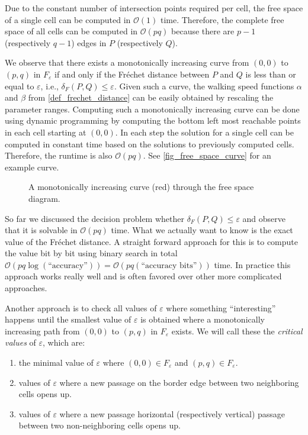 \documentclass[
oneside,
fontsize=11pt
]{scrartcl}
\begin{document}
Due to the constant number of intersection points required per cell, 
the free space of a single cell can be computed in $\mathcal{O}(1)$ time.
Therefore, the complete free space of all cells can be computed in $\mathcal{O}(pq)$
because there are $p-1$ (respectively $q-1$) edges in $P$ (respectively $Q$).

We observe that there exists 
a monotonically increasing curve from $(0,0)$ to $(p,q)$ in $F_\varepsilon$
if and only if the Fréchet distance between $P$ and $Q$ is less than or equal to $\varepsilon$,
i.e., $\delta_F(P,Q) \leq \varepsilon$.
Given such a curve, the walking speed functions $\alpha$ and $\beta$ from \autoref{def_frechet_distance}
can be easily obtained by rescaling the parameter ranges. 
Computing such a monotonically increasing curve can be done using dynamic programming 
by computing the bottom left most reachable points in each cell starting at $(0,0)$. 
In each step the solution for a single cell can be computed in constant time based on the 
solutions to previously computed cells. 
Therefore, the runtime is also $\mathcal{O}(pq)$. 
See \autoref{fig_free_space_curve} for an example curve. \cite{alt_computing_1995}

\begin{figure}[ht]
  \centering
  \resizebox{0.5\textwidth}{!}{
    
  }
  \caption{A monotonically increasing curve (red) through the free space diagram.}
  \label{fig_free_space_curve}
\end{figure}

So far we discussed the decision problem whether $\delta_{F}(P,Q) \leq \varepsilon$
and observe that it is solvable in $\mathcal{O}(pq)$ time.
What we actually want to know is the exact value of the Fréchet distance.
A straight forward approach for this is to compute the value bit by bit 
using binary search in total $\mathcal{O}(pq \log (\text{``accuracy''})) = \mathcal{O}(pq  (\text{``accuracy bits''}))$ time.
In practice this approach works really well 
and is often favored over other more complicated approaches. \cite{alt_computing_1995} 

Another approach is to check all values of $\varepsilon$ where something ``interesting'' happens
until the smallest value of $\varepsilon$ is obtained where a monotonically increasing path 
from $(0,0)$ to $(p,q)$ in $F_\varepsilon$ exists.
We will call these the \textit{critical values} of $\varepsilon$, which are:
\begin{enumerate}
  \item the minimal value of $\varepsilon$ where $(0,0) \in F_\varepsilon$ and $(p,q) \in F_\varepsilon$.
  \item values of $\varepsilon$ where a new passage on the border edge 
        between two neighboring cells opens up.
  \item values of $\varepsilon$ where a new passage horizontal (respectively vertical) passage 
        between two non-neighboring cells opens up.
\end{enumerate}
\end{document}
